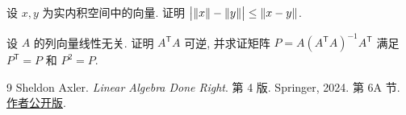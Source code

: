 \begin{exercise}
设 $x,y$ 为实内积空间中的向量. 证明
$\bigl|\lVert x\rVert-\lVert y\rVert\bigr|\le\lVert x-y\rVert$.
\end{exercise}
\begin{exercise}
设 $A$ 的列向量线性无关. 证明 $A^{\mathsf T}A$ 可逆, 并求证矩阵
$P=A(A^{\mathsf T}A)^{-1}A^{\mathsf T}$ 满足 $P^{\mathsf T}=P$ 和 $P^2=P$.
\end{exercise}
\begin{thebibliography}{9}
 Sheldon Axler. \emph{Linear Algebra Done Right}. 第 4 版.
Springer, 2024. 第 6A 节.
\href{https://linear.axler.net/LADR4e.pdf}{作者公开版}.
\end{thebibliography}

